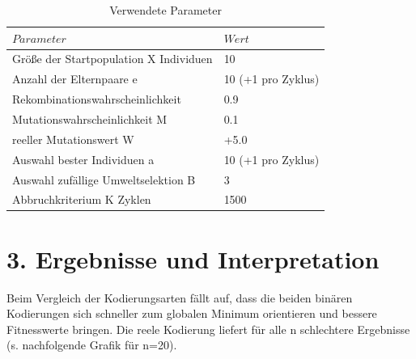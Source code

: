 \documentclass[12pt,
    a4paper,
    headinclude,
    footinclude]{scrreprt}
\begin{document}
\begin{table}[h]
	\centering
	\caption*{Verwendete Parameter}
	\begin{tabularx}{14cm}{|p{9cm}|X|}
		\hline
		$Parameter$ & $Wert$ \\
		\hline
		\hline
		Größe der Startpopulation X Individuen& 10  \\
				\hline
		Anzahl der Elternpaare e & 10 (+1 pro Zyklus)  \\
				\hline
		Rekombinationswahrscheinlichkeit& 0.9 \\
				\hline
		Mutationswahrscheinlichkeit M & 0.1 \\
				\hline
		reeller Mutationswert W& +5.0  \\
				\hline
		Auswahl bester Individuen a& 10 (+1 pro Zyklus) \\
		\hline
		Auswahl zufällige Umweltselektion B& 3 \\
		\hline
		Abbruchkriterium K Zyklen & 1500\\
		\hline
	\end{tabularx}
\end{table}


	
\section*{3. Ergebnisse und Interpretation}	

Beim Vergleich der Kodierungsarten fällt auf, dass die beiden binären Kodierungen sich schneller zum globalen Minimum orientieren und bessere Fitnesswerte bringen. Die reele Kodierung liefert für alle n schlechtere Ergebnisse (s. nachfolgende Grafik für n=20).
\end{document}
